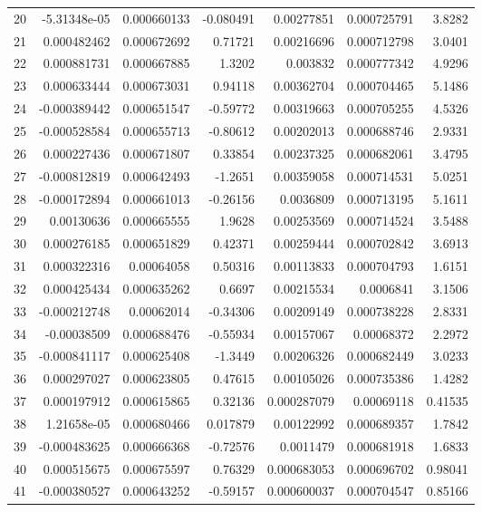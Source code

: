 \documentclass[10pt]{article}
\begin{document}
\begin{longtable}{rrrrrrr}
20 & -5.31348e-05 & 0.000660133 & -0.080491 & 0.00277851 & 0.000725791 & 3.8282 \\
21 & 0.000482462 & 0.000672692 & 0.71721 & 0.00216696 & 0.000712798 & 3.0401 \\
22 & 0.000881731 & 0.000667885 & 1.3202 & 0.003832 & 0.000777342 & 4.9296 \\
23 & 0.000633444 & 0.000673031 & 0.94118 & 0.00362704 & 0.000704465 & 5.1486 \\
24 & -0.000389442 & 0.000651547 & -0.59772 & 0.00319663 & 0.000705255 & 4.5326 \\
25 & -0.000528584 & 0.000655713 & -0.80612 & 0.00202013 & 0.000688746 & 2.9331 \\
26 & 0.000227436 & 0.000671807 & 0.33854 & 0.00237325 & 0.000682061 & 3.4795 \\
27 & -0.000812819 & 0.000642493 & -1.2651 & 0.00359058 & 0.000714531 & 5.0251 \\
28 & -0.000172894 & 0.000661013 & -0.26156 & 0.0036809 & 0.000713195 & 5.1611 \\
29 & 0.00130636 & 0.000665555 & 1.9628 & 0.00253569 & 0.000714524 & 3.5488 \\
30 & 0.000276185 & 0.000651829 & 0.42371 & 0.00259444 & 0.000702842 & 3.6913 \\
31 & 0.000322316 & 0.00064058 & 0.50316 & 0.00113833 & 0.000704793 & 1.6151 \\
32 & 0.000425434 & 0.000635262 & 0.6697 & 0.00215534 & 0.0006841 & 3.1506 \\
33 & -0.000212748 & 0.00062014 & -0.34306 & 0.00209149 & 0.000738228 & 2.8331 \\
34 & -0.00038509 & 0.000688476 & -0.55934 & 0.00157067 & 0.00068372 & 2.2972 \\
35 & -0.000841117 & 0.000625408 & -1.3449 & 0.00206326 & 0.000682449 & 3.0233 \\
36 & 0.000297027 & 0.000623805 & 0.47615 & 0.00105026 & 0.000735386 & 1.4282 \\
37 & 0.000197912 & 0.000615865 & 0.32136 & 0.000287079 & 0.00069118 & 0.41535 \\
38 & 1.21658e-05 & 0.000680466 & 0.017879 & 0.00122992 & 0.000689357 & 1.7842 \\
39 & -0.000483625 & 0.000666368 & -0.72576 & 0.0011479 & 0.000681918 & 1.6833 \\
40 & 0.000515675 & 0.000675597 & 0.76329 & 0.000683053 & 0.000696702 & 0.98041 \\
41 & -0.000380527 & 0.000643252 & -0.59157 & 0.000600037 & 0.000704547 & 0.85166 \\

\end{longtable}
\end{document}
